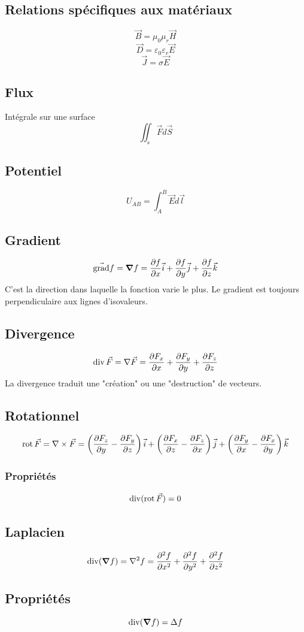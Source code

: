 \documentclass[resume]{subfiles}
\begin{document}
\subsection{Relations spécifiques aux matériaux}
$$\vec{B}=\mu_0\mu_r\vec{H}$$
$$\vec{D}=\varepsilon_0\varepsilon_r\vec{E}$$
$$\vec{J}=\sigma\vec{E}$$
\subsection{Flux}
Intégrale sur une surface
$$\iint_s\vec{F}d\vec{S}$$
\subsection{Potentiel}
$$U_{AB}=\int_{A}^{B}\vec{E}d\vec{l}$$
\subsection{Gradient}
$$\vec{\text{grad}}f=\grad f=\frac{\partial f}{\partial x}\vec{i}+\frac{\partial f}{\partial y}\vec{j}+\frac{\partial f}{\partial z}\vec{k}$$
C'est la direction dans laquelle la fonction varie le plus. Le gradient est toujours perpendiculaire aux lignes d'isovaleurs.
\subsection{Divergence}
$$\operatorname{div}\vec{F}=\nabla \vec{F}=\frac{\partial F_x}{\partial x}+\frac{\partial F_y}{\partial y}+\frac{\partial F_z}{\partial z}$$
La divergence traduit une "création" ou une "destruction" de vecteurs.
\subsection{Rotationnel}
$$\operatorname{rot} \vec{F}=\nabla \times \vec{F}=\left(\frac{\partial F_z}{\partial y}-\frac{\partial F_y}{\partial z}\right)\vec{i}+\left(\frac{\partial F_x}{\partial z}- \frac{\partial F_z}{\partial x}\right)\vec{j}+\left(\frac{\partial F_y}{\partial x}-\frac{\partial F_x}{\partial y}\right)\vec{k}$$
\subsubsection{Propriétés}
$$\operatorname{div}(\operatorname{rot} \vec{F})=0$$
\subsection{Laplacien}
$$\operatorname{div}(\grad f)=\nabla^2 f=\frac{\partial^2 f}{\partial x^2}+\frac{\partial^2 f}{\partial y^2}+\frac{\partial^2 f}{\partial z^2}$$
\subsection{Propriétés}
$$\operatorname{div}(\grad f)=\Delta f$$
\end{document}
